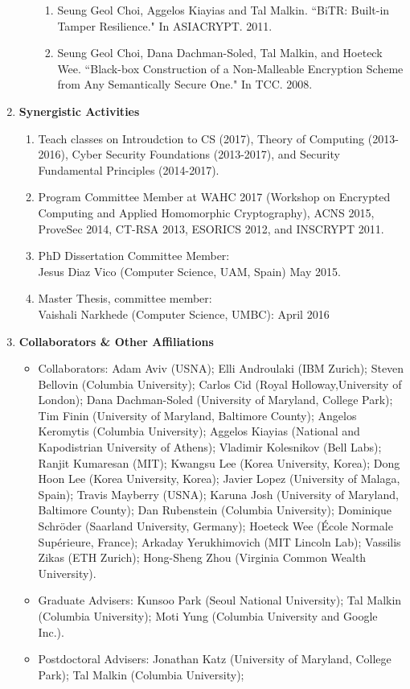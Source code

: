 \documentclass[11pt]{article}
\def\BI{\begin{itemize}}
\def\EI{\end{itemize}}
\begin{document}
\begin{enumerate}[label=\textbf{(\alph*)}]
\begin{enumerate}[label=(\roman*)]
\begin{enumerate}[label=\arabic*.]
\item 
Seung Geol Choi, Aggelos Kiayias and Tal Malkin.
``BiTR: Built-in Tamper Resilience." 
In ASIACRYPT. 2011.


\item
Seung Geol Choi, Dana Dachman-Soled, Tal Malkin, and Hoeteck Wee. 
``Black-box Construction of a Non-Malleable Encryption Scheme from Any Semantically Secure One."
In TCC. 2008. 
\end{enumerate}
\end{enumerate}

\item {\bf Synergistic Activities}

\begin{enumerate}[label=\arabic*.]
 \item Teach classes on Introudction to CS (2017), Theory of Computing
    (2013-2016), Cyber Security Foundations (2013-2017), and Security
    Fundamental Principles (2014-2017).
\item Program Committee Member at
  WAHC 2017 (Workshop on Encrypted Computing and Applied Homomorphic
   Cryptography), ACNS 2015, ProveSec 2014, CT-RSA 2013, ESORICS 2012, and
  INSCRYPT 2011.   
\item PhD Dissertation Committee Member: \\
    Jesus Diaz Vico (Computer Science, UAM, Spain) May 2015.
\item Master Thesis, committee member: \\
Vaishali Narkhede (Computer Science, UMBC): April 2016
\end{enumerate}

\item {\bf Collaborators \& Other Affiliations}
\BI

\item Collaborators:
	  Adam Aviv (USNA);
    Elli Androulaki (IBM Zurich);
    Steven Bellovin (Columbia University); 
    Carlos Cid (Royal Holloway,University of London);
    Dana Dachman-Soled (University of Maryland, College Park);
    Tim Finin (University of Maryland, Baltimore County); 
    Angelos Keromytis (Columbia University);
    Aggelos Kiayias (National and Kapodistrian University of Athens);
    Vladimir Kolesnikov (Bell Labs);
    Ranjit Kumaresan (MIT);
    Kwangsu Lee (Korea University, Korea);
    Dong Hoon Lee (Korea University, Korea);
    Javier Lopez (University of Malaga, Spain);
	  Travis Mayberry (USNA);
    Karuna Josh (University of Maryland, Baltimore County);
    Dan Rubenstein (Columbia University);
    Dominique Schr{\"o}der (Saarland University, Germany);
    Hoeteck Wee (\'Ecole Normale Sup\'erieure, France);
    Arkaday Yerukhimovich (MIT Lincoln Lab);
    Vassilis Zikas (ETH Zurich); 
    Hong-Sheng Zhou (Virginia Common Wealth University). 

\item Graduate Advisers: Kunsoo Park (Seoul National
    University); Tal Malkin (Columbia University); Moti
    Yung (Columbia University and Google Inc.).
\item Postdoctoral Advisers:  Jonathan Katz (University of
    Maryland, College Park); Tal Malkin (Columbia University);
\EI
\end{enumerate}
\end{document}
